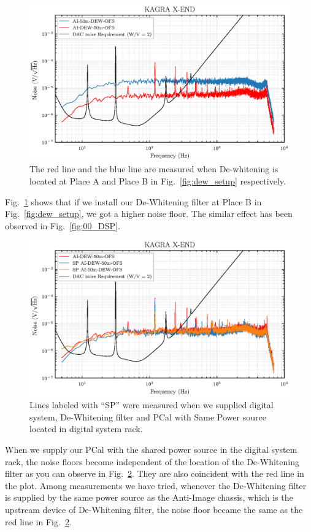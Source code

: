 \begin{figure}[hbt!]
\centering
\includegraphics[width=1\textwidth]{figure/noise/01_AvsB}
\caption[Noise measurement with PCal and different location of the De-whitening]{ The red line and the blue line are measured when De-whitening is located at Place A and Place B in Fig.~\ref{fig:dew_setup} respectively.}
\label{fig:01_AvsB}
\end{figure}

Fig.~\ref{fig:01_AvsB} shows that if we install our De-Whitening filter at Place B in Fig.~\ref{fig:dew_setup}, we got a higher noise floor. The similar effect has been observed in Fig.~\ref{fig:00_DSP}. 

\pagebreak

\begin{figure}[hbt!]
\centering
\includegraphics[width=1\textwidth]{figure/noise/01_SP}
\caption[Noise measurement with PCal and different power source]{ Lines labeled with ``SP'' were measured when we supplied digital system, De-Whitening filter and PCal with Same Power source located in digital system rack. }
\label{fig:01_SP}
\end{figure}

When we supply our PCal with the shared power source in the digital system rack, the noise floors become independent of the location of the De-Whitening filter as you can observe in Fig.~\ref{fig:01_SP}. They are also coincident with the red line in the plot. Among measurements we have tried, whenever the De-Whitening filter is supplied by the same power source as the Anti-Image chassis, which is the upstream device of De-Whitening filter, the noise floor became the same as the red line in Fig.~\ref{fig:01_SP}.
